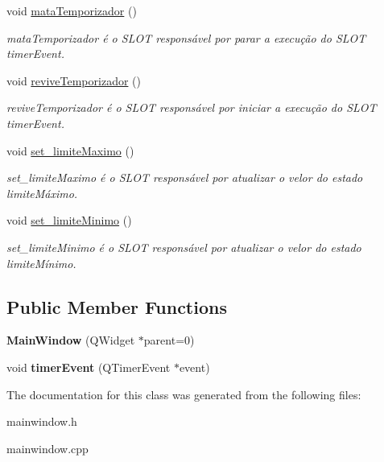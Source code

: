 \begin{DoxyCompactItemize}
void \mbox{\hyperlink{class_main_window_ac4725e6ca6bdfe248d1d5843e44e13f1}{mata\+Temporizador}} ()
\begin{DoxyCompactList}\small\item\em mata\+Temporizador é o S\+L\+OT responsável por parar a execução do S\+L\+OT timer\+Event. \end{DoxyCompactList}\item 
\mbox{\label{class_main_window_ac1e2c1652f678f2e14df2c1d859965c9}} 
void \mbox{\hyperlink{class_main_window_ac1e2c1652f678f2e14df2c1d859965c9}{revive\+Temporizador}} ()
\begin{DoxyCompactList}\small\item\em revive\+Temporizador é o S\+L\+OT responsável por iniciar a execução do S\+L\+OT timer\+Event. \end{DoxyCompactList}\item 
\mbox{\label{class_main_window_ab6e494146f91d7302bfa1a7279271f67}} 
void \mbox{\hyperlink{class_main_window_ab6e494146f91d7302bfa1a7279271f67}{set\+\_\+limite\+Maximo}} ()
\begin{DoxyCompactList}\small\item\em set\+\_\+limite\+Maximo é o S\+L\+OT responsável por atualizar o velor do estado limite\+Máximo. \end{DoxyCompactList}\item 
\mbox{\label{class_main_window_a66822d57271c54af9d55c4efbc087415}} 
void \mbox{\hyperlink{class_main_window_a66822d57271c54af9d55c4efbc087415}{set\+\_\+limite\+Minimo}} ()
\begin{DoxyCompactList}\small\item\em set\+\_\+limite\+Minimo é o S\+L\+OT responsável por atualizar o velor do estado limite\+Mínimo. \end{DoxyCompactList}\end{DoxyCompactItemize}
\subsection*{Public Member Functions}
\begin{DoxyCompactItemize}
\item 
\mbox{\label{class_main_window_a8b244be8b7b7db1b08de2a2acb9409db}} 
{\bfseries Main\+Window} (Q\+Widget $\ast$parent=0)
\item 
\mbox{\label{class_main_window_aaa425b1554af3c1f58cc70b4815082ae}} 
void {\bfseries timer\+Event} (Q\+Timer\+Event $\ast$event)
\end{DoxyCompactItemize}


The documentation for this class was generated from the following files\+:\begin{DoxyCompactItemize}
\item 
mainwindow.\+h\item 
mainwindow.\+cpp\end{DoxyCompactItemize}
